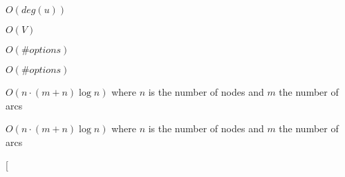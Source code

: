 
\begin{DoxyRefList}
\item[\label{time__time000002}%
\Hypertarget{time__time000002}%
Member \hyperlink{class_contraction_precomputation_a6cbc9c5ee6d4ec9a5092d6e624922396}{Contraction\+Precomputation\+:\+:contract\+\_\+arc} (\hyperlink{class_landscape}{Landscape} \&contracted\+\_\+landscape, \hyperlink{class_restoration_plan}{Restoration\+Plan} \&plan, Graph\+\_\+t\+::\+Arc a) const]$O(deg(u))$  
\item[\label{time__time000001}%
\Hypertarget{time__time000001}%
Member \hyperlink{class_contraction_precomputation_ab4ae0b053d4cb51b2d2c4d07027ee2b7}{Contraction\+Precomputation\+:\+:erase\+\_\+non\+\_\+connected} (\hyperlink{class_landscape}{Landscape} \&landscape, Graph\+\_\+t\+::\+Node t) const]$O(V)$  
\item[\label{time__time000003}%
\Hypertarget{time__time000003}%
Member \hyperlink{class_contraction_precomputation_a6ea4ee46a1805ced601de847969cab61}{Contraction\+Precomputation\+:\+:model\+\_\+quality\+\_\+gains} (\hyperlink{class_landscape}{Landscape} \&landscape, \hyperlink{class_restoration_plan}{Restoration\+Plan} \&plan, std\+::vector$<$ std\+::vector$<$ Graph\+\_\+t\+::\+Arc $>$$>$ \&options\+\_\+nodes) const]$O(\#options)$  
\item[\label{time__time000004}%
\Hypertarget{time__time000004}%
Member \hyperlink{class_contraction_precomputation_a6749c81605043e4398c80b49293b44c6}{Contraction\+Precomputation\+:\+:retrive\+\_\+quality\+\_\+gains} (\hyperlink{class_landscape}{Landscape} \&landscape, \hyperlink{class_restoration_plan}{Restoration\+Plan} \&plan, const std\+::vector$<$ std\+::vector$<$ Graph\+\_\+t\+::\+Arc $>$$>$ \&options\+\_\+nodes) const]$O(\#options)$  
\item[\label{time__time000005}%
\Hypertarget{time__time000005}%
Member \hyperlink{class_e_c_a_af8127c6291b457b8c7033f23d1656767}{E\+CA\+:\+:eval} (const concepts\+::\+Abstract\+Landscape$<$ G\+R, Q\+M, P\+M, C\+M $>$ \&landscape, const typename G\+R\+::template Node\+Map$<$ bool $>$ \&node\+Filter)]$O(n \cdot (m + n) \log n)$ where $n$ is the number of nodes and $m$ the number of arcs  
\item[\label{time__time000006}%
\Hypertarget{time__time000006}%
Member \hyperlink{class_e_c_a_ab6556319590259a816cf176e933746d7}{E\+CA\+:\+:eval} (const concepts\+::\+Abstract\+Landscape$<$ G\+R, Q\+M, P\+M, C\+M $>$ \&landscape)]$O(n \cdot (m + n) \log n)$ where $n$ is the number of nodes and $m$ the number of arcs  
\item[\label{time__time000014}%

\end{DoxyRefList}
